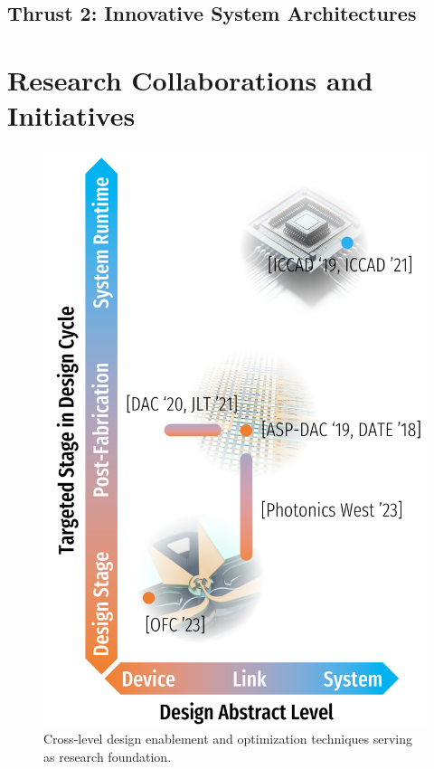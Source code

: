 \subsection{Thrust 2: Innovative System Architectures}


\section{Research Collaborations and Initiatives}

\begin{figure}[!ht]%
    \includegraphics[width=\linewidth]{../../fig/research.pdf}
    \caption{Cross-level design enablement and optimization techniques serving as research foundation.}
    \label{fig:research}
\end{figure}

